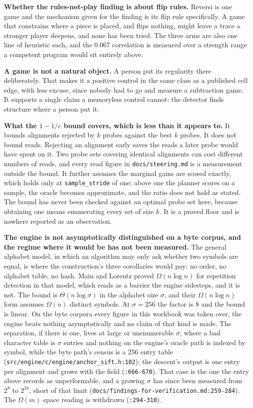 \textbf{Whether the rules-not-play finding is about flip rules.} Reversi is one game and the mechanism given for the finding is its flip rule specifically. A game that constrains where a piece is placed, and flips nothing, might leave a trace a stronger player deepens, and none has been tried. The three arms are also one line of heuristic each, and the 0.067 correlation is measured over a strength range a competent program would sit entirely above.

\textbf{A game is not a natural object.} A person put its regularity there deliberately. That makes it a positive control in the same class as a published cell edge, with less excuse, since nobody had to go and measure a subtraction game. It supports a single claim a memoryless control cannot: the detector finds structure where a person put it.

\textbf{What the \(1 - 1/e\) bound covers, which is less than it appears to.} It bounds alignments rejected by \(k\) probes against the best \(k\) probes. It does not bound reads. Rejecting an alignment early saves the reads a later probe would have spent on it. Two probe sets covering identical alignments can cost different numbers of reads, and every read figure in \texttt{docs/\allowbreak{}steering.md} is a measurement outside the bound. It further assumes the marginal gains are scored exactly, which holds only at \texttt{sample\_stride} of one; above one the planner scores on a sample, the oracle becomes approximate, and the ratio does not hold as stated. The bound has never been checked against an optimal probe set here, because obtaining one means enumerating every set of size \(k\). It is a proved floor and is nowhere reported as an observation.

\textbf{The engine is not asymptotically distinguished on a byte corpus, and the regime where it would be has not been measured.} The general alphabet model, in which an algorithm may only ask whether two symbols are equal, is where the construction's three corollaries would pay: no order, no alphabet table, no hash. Main and Lorentz proved \(\Omega(n \log n)\) for repetition detection in that model, which reads as a barrier the engine sidesteps, and it is not. The bound is \(\Theta(n \log \sigma)\) in the alphabet size \(\sigma\), and their \(\Omega(n \log n)\) form assumes \(\Omega(n)\) distinct symbols. At \(\sigma = 256\) the factor is 8 and the bound is linear. On the byte corpora every figure in this workbook was taken over, the engine beats nothing asymptotically and no claim of that kind is made. The separation, if there is one, lives at large or unenumerable \(\sigma\), where a bad character table is \(\sigma\) entries and nothing on the engine's oracle path is indexed by symbol, while the byte path's census is a 256 entry table (\texttt{src/\allowbreak{}engine/\allowbreak{}c/\allowbreak{}engine/\allowbreak{}anchor\_sift.h:102}); the descent's output is one entry per alignment and grows with the field (\texttt{:666-670}). That case is the one the entry above records as unperformable, and a growing \(\sigma\) has since been measured from \(2^8\) to \(2^{24}\), short of that limit (\texttt{docs/\allowbreak{}findings-\allowbreak{}for-\allowbreak{}verification.md:259-284}). The \(\Omega(m)\) space reading is withdrawn (\texttt{:294-310}).

